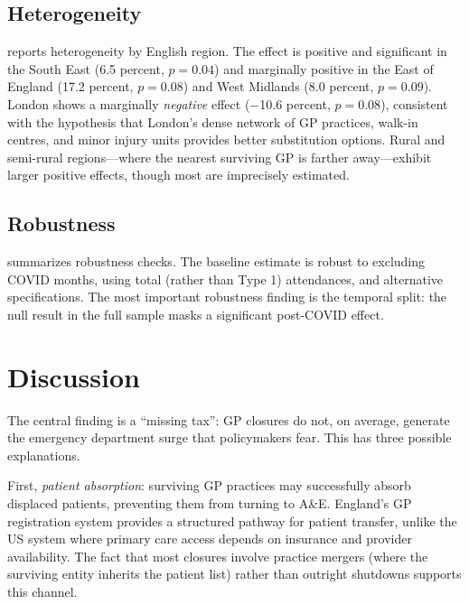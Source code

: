 \documentclass[12pt]{article}
\begin{document}
\subsection{Heterogeneity}

 reports heterogeneity by English region. The effect is positive and significant in the South East (6.5 percent, $p = 0.04$) and marginally positive in the East of England (17.2 percent, $p = 0.08$) and West Midlands (8.0 percent, $p = 0.09$). London shows a marginally \textit{negative} effect ($-$10.6 percent, $p = 0.08$), consistent with the hypothesis that London's dense network of GP practices, walk-in centres, and minor injury units provides better substitution options. Rural and semi-rural regions---where the nearest surviving GP is farther away---exhibit larger positive effects, though most are imprecisely estimated.



\subsection{Robustness}

 summarizes robustness checks. The baseline estimate is robust to excluding COVID months, using total (rather than Type 1) attendances, and alternative specifications. The most important robustness finding is the temporal split: the null result in the full sample masks a significant post-COVID effect.




\section{Discussion}

The central finding is a ``missing tax'': GP closures do not, on average, generate the emergency department surge that policymakers fear. This has three possible explanations.

First, \textit{patient absorption}: surviving GP practices may successfully absorb displaced patients, preventing them from turning to A\&E. England's GP registration system provides a structured pathway for patient transfer, unlike the US system where primary care access depends on insurance and provider availability. The fact that most closures involve practice mergers (where the surviving entity inherits the patient list) rather than outright shutdowns supports this channel.
\end{document}
